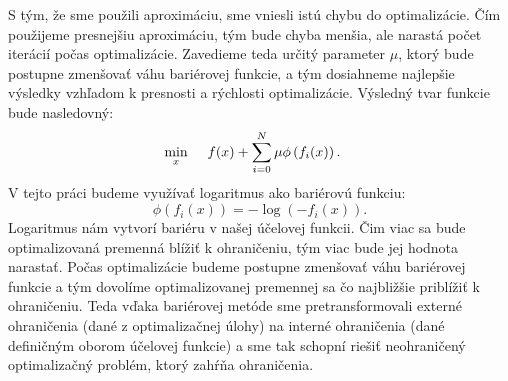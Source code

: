 S tým, že sme použili aproximáciu, sme vniesli istú chybu do optimalizácie. Čím použijeme presnejšiu aproximáciu, tým bude chyba menšia, ale narastá počet iterácií počas optimalizácie. Zavedieme teda určitý parameter $\mu$, ktorý bude postupne zmenšovať váhu bariérovej funkcie, a tým dosiahneme najlepšie výsledky vzhľadom k presnosti a rýchlosti optimalizácie. Výsledný tvar funkcie bude nasledovný:
\begin{align}
\displaystyle \min_{x} \hspace{0.5cm} & 
f(x) + \sum_{i=0}^{N}\mu\phi\left(f_{i}(x)\right).
\end{align}
V tejto práci budeme využívať logaritmus ako bariérovú funkciu:
\begin{equation}
	\phi\left(f_{i}(x)\right) = -\log(-f_{i}(x)).
\end{equation}
Logaritmus nám vytvorí bariéru v našej účelovej funkcii. Čim viac sa bude optimalizovaná premenná blížiť k ohraničeniu, tým viac bude jej hodnota narastať. Počas optimalizácie budeme postupne zmenšovať váhu bariérovej funkcie a tým dovolíme optimalizovanej premennej sa čo najbližšie priblížiť k ohraničeniu. Teda vďaka bariérovej metóde sme pretransformovali externé ohraničenia (dané z optimalizačnej úlohy) na interné ohraničenia (dané definičným oborom účelovej funkcie) a sme tak schopní riešiť neohraničený optimalizačný problém, ktorý zahŕňa ohraničenia. 